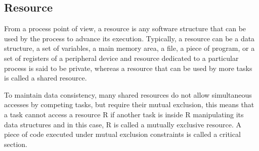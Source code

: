 

\subsection{Resource}

From a process point of view, a resource is any software structure that can be used by
the process to advance its execution. Typically, a resource can be a data structure, a
set of variables, a main memory area, a file, a piece of program, or a set of registers of
a peripheral device and resource dedicated to a particular process is said to be private,
whereas a resource that can be used by more tasks is called a shared resource.\cite{b5}

To maintain data consistency, many shared resources do not allow simultaneous accesses by competing tasks, but require their mutual exclusion, this means that a task cannot access a resource R if another task is inside R manipulating its data structures and in this case, R is called a mutually exclusive resource. A piece of code executed under mutual exclusion constraints is called a critical section.\cite{b5}


